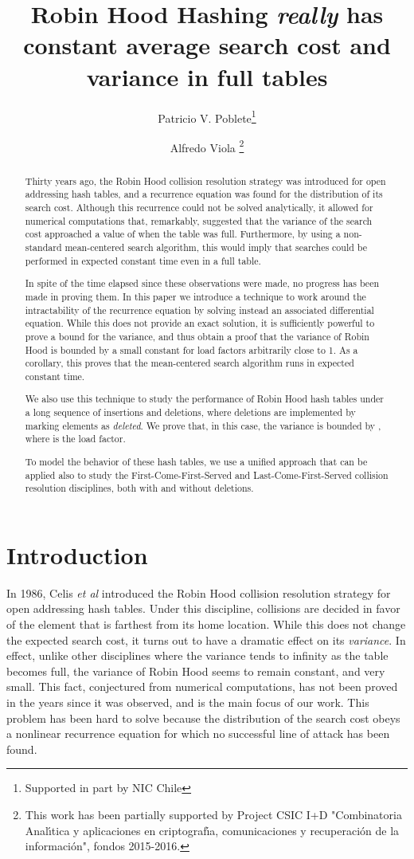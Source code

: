 \documentclass[proceedings]{aofa}
\author[P.V Poblete and A. Viola]{Patricio V. Poblete\addressmark{1}\thanks{
Supported in part by NIC Chile
}\and Alfredo Viola\addressmark{2}
\thanks{
This work has been partially supported by Project
CSIC I+D "Combinatoria Anal\'{\i}tica y aplicaciones en
criptograf\'{\i}a, comunicaciones y recuperaci\'on de la
informaci\'on", fondos 2015-2016.}
}
\title{Robin Hood Hashing \emph{really} has constant average search cost and variance in full tables}
\begin{document}
\maketitle
\begin{abstract}
Thirty years ago, the Robin Hood collision resolution strategy was introduced for open addressing hash tables, and a recurrence equation was found for the distribution of its search cost. Although this recurrence could not be solved analytically, it allowed for numerical computations that, remarkably, suggested that the variance of the search cost approached a value of  when the table was full. Furthermore, by using a non-standard mean-centered search algorithm, this would imply that searches could be performed in expected constant time even in a full table.

In spite of the time elapsed since these observations were made, no progress has been made in proving them.
In this paper we introduce a technique to work around the intractability of the recurrence equation by solving instead an associated differential equation. While this does not provide an exact solution, it is sufficiently powerful to prove a bound for the variance, and thus obtain a proof that the variance of Robin Hood is bounded by a small constant for load factors arbitrarily close to 1. As a corollary, this proves that the mean-centered search algorithm runs in expected constant time.

We also use this technique to study the performance of Robin Hood hash tables under a long sequence of insertions and deletions, where deletions are implemented by marking elements as {\em deleted}. We prove that, in this case, the variance is bounded by , where  is the load factor.

To model the behavior of these hash tables, we use a unified approach that can be applied also to study the First-Come-First-Served and Last-Come-First-Served collision resolution disciplines, both with and without deletions.

\end{abstract}

\section{Introduction}
In 1986,  Celis {\it{et al}} \cite{CelisT,Celis} introduced the Robin Hood collision resolution strategy for open addressing hash tables. Under this discipline, collisions are decided in favor of the element that is farthest from its home location.
While this does not change the expected search cost, it turns out to have a dramatic effect on its {\em variance}. In effect, unlike other disciplines where the variance tends to infinity as the table becomes full, the variance of Robin Hood seems to remain constant, and very small. This fact, conjectured from numerical computations, has not been proved in the years since it was observed, and is the main focus of our work. This problem has been hard to solve because the distribution of the search cost obeys a nonlinear recurrence equation for which no successful line of attack has been found.
\end{document}
